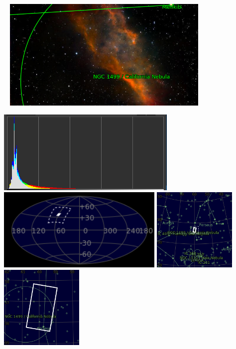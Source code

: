 \begin{center}
 \ \newpage
\includegraphics[width=0.75\textwidth]{../Imaging//Annotated/California_Nebula_Annotated.jpg}

\includegraphics[height=4cm]{../Imaging//Annotated/California_Nebula_Hist}
\includegraphics[height=4cm]{../Imaging//Annotated/California_Nebula_Globe.jpg}
\includegraphics[height=4cm]{../Imaging//Annotated/California_Nebula_Close.jpg}
\includegraphics[height=4cm]{../Imaging//Annotated/California_Nebula_Closer.jpg}
\end{center}
